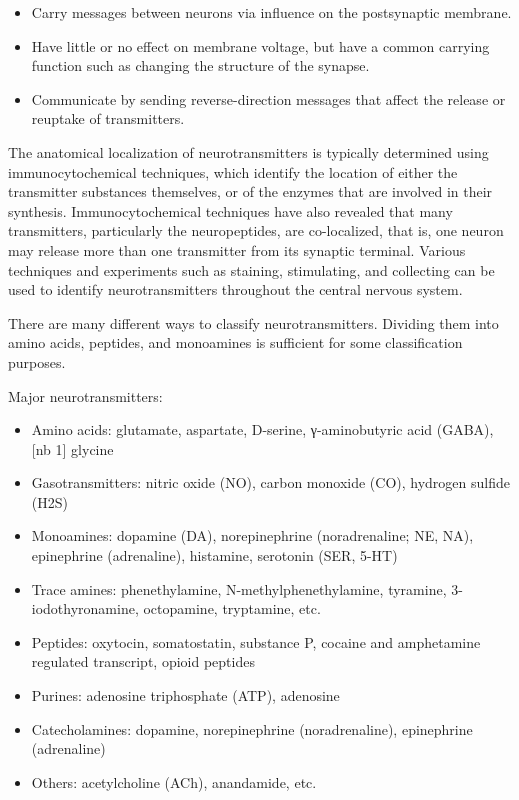\begin{itemize}
\tightlist
\item
  Carry messages between neurons via influence on the postsynaptic membrane.
\item
  Have little or no effect on membrane voltage, but have a common carrying function such as changing the structure of the synapse.
\item
  Communicate by sending reverse-direction messages that affect the release or reuptake of transmitters.
\end{itemize}

The anatomical localization of neurotransmitters is typically determined using immunocytochemical techniques, which identify the location of either the transmitter substances themselves, or of the enzymes that are involved in their synthesis. Immunocytochemical techniques have also revealed that many transmitters, particularly the neuropeptides, are co-localized, that is, one neuron may release more than one transmitter from its synaptic terminal. Various techniques and experiments such as staining, stimulating, and collecting can be used to identify neurotransmitters throughout the central nervous system.

There are many different ways to classify neurotransmitters. Dividing them into amino acids, peptides, and monoamines is sufficient for some classification purposes.

Major neurotransmitters:

\begin{itemize}
\tightlist
\item
  Amino acids: glutamate, aspartate, D-serine, γ-aminobutyric acid (GABA),{[}nb 1{]} glycine
\item
  Gasotransmitters: nitric oxide (NO), carbon monoxide (CO), hydrogen sulfide (H2S)
\item
  Monoamines: dopamine (DA), norepinephrine (noradrenaline; NE, NA), epinephrine (adrenaline), histamine, serotonin (SER, 5-HT)
\item
  Trace amines: phenethylamine, N-methylphenethylamine, tyramine, 3-iodothyronamine, octopamine, tryptamine, etc.
\item
  Peptides: oxytocin, somatostatin, substance P, cocaine and amphetamine regulated transcript, opioid peptides
\item
  Purines: adenosine triphosphate (ATP), adenosine
\item
  Catecholamines: dopamine, norepinephrine (noradrenaline), epinephrine (adrenaline)
\item
  Others: acetylcholine (ACh), anandamide, etc.
\end{itemize}

